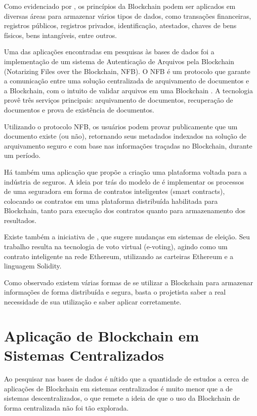 \documentclass[openright]{normas-utf-tex} %
\begin{document}
Como evidenciado por , os princípios da Blockchain podem ser aplicados em diversas áreas para armazenar vários tipos de dados, como transações financeiras, registros públicos, registros privados, identificação, atestados, chaves de bens físicos, bens intangíveis, entre outros.

Uma das aplicações encontradas em pesquisas às bases de dados foi a implementação de um sistema de Autenticação de Arquivos pela Blockchain (Notarizing Files over the Blockchain, NFB). O NFB é um protocolo que garante a comunicação entre uma solução centralizada de arquivamento de documentos e a Blockchain, com o intuito de validar arquivos em uma Blockchain \cite{Magrahi2018}. A tecnologia provê três serviços principais: arquivamento de documentos, recuperação de documentos e prova de existência de documentos. 

Utilizando o protocolo NFB, os usuários podem provar publicamente que um documento existe (ou não), retornando seus metadados indexados na solução de arquivamento seguro e com base nas informações traçadas no Blockchain, durante um período.

Há também uma aplicação que propõe a criação uma plataforma voltada para a indústria de seguros. A ideia por trás do modelo de  é implementar os processos de uma seguradora em forma de contratos inteligentes (smart contracts), colocando os contratos em uma plataforma distribuída habilitada para Blockchain, tanto para execução dos contratos quanto para armazenamento dos resultados.

Existe também a iniciativa de , que sugere mudanças em sistemas de eleição. Seu trabalho resulta na tecnologia de voto virtual (e-voting), agindo como um contrato inteligente na rede Ethereum, utilizando as carteiras Ethereum e a linguagem Solidity.

Como observado existem várias formas de se utilizar a Blockchain para armazenar informações de forma distribuída e segura, basta o projetista saber a real necessidade de sua utilização e saber aplicar corretamente.


\section{Aplicação de Blockchain em Sistemas Centralizados}

Ao pesquisar nas bases de dados é nítido que a quantidade de estudos a cerca de aplicações de Blockchain em sistemas centralizados é muito menor que a de sistemas descentralizados, o que remete a ideia de que o uso da Blockchain de forma centralizada não foi tão explorada.
\end{document}
